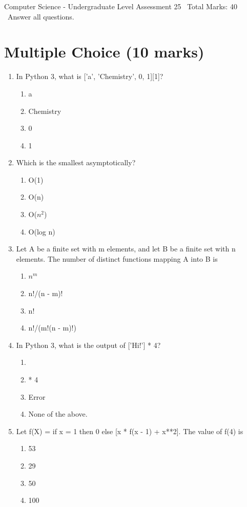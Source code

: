 \documentclass[12pt]{article}
\begin{document}
\begin{center}
Computer Science - Undergraduate Level Assessment 25 \
Total Marks: 40 \
Answer all questions.
\end{center}

\section*{Multiple Choice (10 marks)}
\begin{enumerate}[label=\arabic*.]
\item In Python 3, what is ['a', 'Chemistry', 0, 1][1]?
\begin{enumerate}[label=(\alph*)]
    \item a
    \item Chemistry
    \item 0
    \item 1
\end{enumerate}
\item Which is the smallest asymptotically?
\begin{enumerate}[label=(\alph*)]
    \item O(1)
    \item O(n)
    \item O($n^2$)
    \item O(log n)
\end{enumerate}
\item Let A be a finite set with m elements, and let B be a finite set with n elements. The number of distinct functions mapping A into B is
\begin{enumerate}[label=(\alph*)]
    \item $n^m$
    \item n!/(n - m)!
    \item n!
    \item n!/(m!(n - m)!)
\end{enumerate}
\item In Python 3, what is the output of ['Hi!'] * 4?
\begin{enumerate}[label=(\alph*)]
    \item ['Hi!', 'Hi!', 'Hi!', 'Hi!']
    \item ['Hi!'] * 4
    \item Error
    \item None of the above.
\end{enumerate}
\item Let f(X) = if x = 1 then 0 else [x * f(x - 1) + x**2]. The value of f(4) is
\begin{enumerate}[label=(\alph*)]
    \item 53
    \item 29
    \item 50
    \item 100
\end{enumerate}
\end{enumerate}
\end{document}
